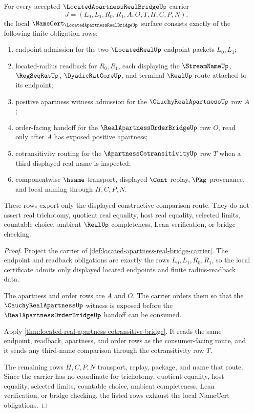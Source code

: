 \begin{theorem}
\label{thm:located-apartness-real-bridge-namecert-obligations}
For every accepted $\LocatedApartnessRealBridgeUp$ carrier
$$
J=(L_0,L_1,R_0,R_1,A,O,T,H,C,P,N),
$$
the local $\NameCert_{\LocatedApartnessRealBridgeUp}$ surface consists exactly of the following finite obligation rows:
\begin{enumerate}
\item endpoint admission for the two $\LocatedRealUp$ endpoint packets $L_0,L_1$;
\item located-radius readback for $R_0,R_1$, each displaying the $\StreamNameUp$, $\RegSeqRatUp$, $\DyadicRatCoreUp$, and terminal $\RealUp$ route attached to its endpoint;
\item positive apartness witness admission for the $\CauchyRealApartnessUp$ row $A$;
\item order-facing handoff for the $\RealApartnessOrderBridgeUp$ row $O$, read only after $A$ has exposed positive apartness;
\item cotransitivity routing for the $\ApartnessCotransitivityUp$ row $T$ when a third displayed real name is inspected;
\item componentwise $\hsame$ transport, displayed $\Cont$ replay, $\Pkg$ provenance, and local naming through $H,C,P,N$.
\end{enumerate}
These rows export only the displayed constructive comparison route. They do not assert real trichotomy, quotient real equality, host real equality, selected limits, countable choice, ambient $\RealUp$ completeness, Lean verification, or bridge checking.
\end{theorem}
\begin{proof}
Project the carrier of \autoref{def:located-apartness-real-bridge-carrier}. The endpoint and readback obligations are exactly the rows $L_0,L_1,R_0,R_1$, so the local certificate admits only displayed located endpoints and finite radius-readback data.

The apartness and order rows are $A$ and $O$. The carrier orders them so that the $\CauchyRealApartnessUp$ witness is exposed before the $\RealApartnessOrderBridgeUp$ handoff can be consumed.

Apply \autoref{thm:located-real-apartness-cotransitive-bridge}. It reads the same endpoint, readback, apartness, and order rows as the consumer-facing route, and it sends any third-name comparison through the cotransitivity row $T$.

The remaining rows $H,C,P,N$ transport, replay, package, and name that route. Since the carrier has no coordinate for trichotomy, quotient equality, host equality, selected limits, countable choice, ambient completeness, Lean verification, or bridge checking, the listed rows exhaust the local NameCert obligations.
\end{proof}

